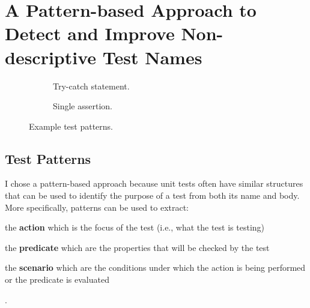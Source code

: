 \documentclass[proposal.tex]{subfiles}
\begin{document}
\section{A Pattern-based Approach to Detect and Improve Non-descriptive Test Names}
\label{sec:test-pattern}

\begin{figure}[t]
\centering
\begin{subfigure}{0.9\textwidth}
    \caption{Try-catch statement.}
    \label{PatternExample_tc}
\end{subfigure}
\begin{subfigure}{0.9\textwidth}
    \caption{Single assertion.}
    \label{PatternExample_allA}
\end{subfigure}
\caption{Example test patterns.}
\label{fig:example-patterns}
\end{figure}

\subsection{Test Patterns}
\label{sec:test_patterns}

I chose a pattern-based approach because unit tests often have similar structures that can be used to identify the purpose of a test from both its name and body.
%
More specifically, patterns can be used to extract:
\begin{enumerate*}
    \item the \textbf{action} which is the focus of the test (i.e., what the test is testing)
    \item the \textbf{predicate} which are the properties that will be checked by the test
    \item the \textbf{scenario} which are the conditions under which the action is being performed or the predicate is evaluated
\end{enumerate*}.
\end{document}
